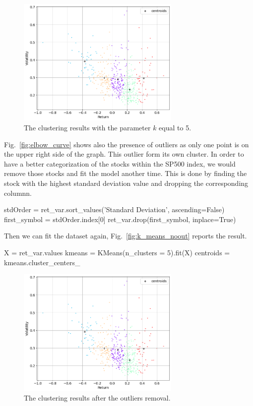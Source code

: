 \begin{figure}
\centering
\includegraphics[width=0.7\textwidth]{figures/k_means_5}
\caption{The clustering results with the parameter $k$ equal to 5.}
\label{fig:K_means_5}
\end{figure}
 
Fig.~\ref{fig:elbow_curve} shows also the presence of outliers as only one point is on the upper right side of the graph. This outlier form its own cluster. In order to have a better categorization of the stocks within the SP500 index, we would remove those stocks and fit the model another time.
This is done by finding the stock with the highest standard deviation value and dropping the corresponding columnn.
 
\begin{ipython}
stdOrder = ret_var.sort_values('Standard Deviation', ascending=False)
first_symbol = stdOrder.index[0]
ret_var.drop(first_symbol, inplace=True)
\end{ipython}
Then we can fit the dataset again, Fig.~\ref{fig:k_means_noout} reports the result.

\begin{ipython}
X = ret_var.values
kmeans = KMeans(n_clusters = 5).fit(X)
centroids = kmeans.cluster_centers_
\end{ipython}
 
\begin{figure}
\centering
\includegraphics[width=0.7\textwidth]{figures/k_means_noout}
\caption{The clustering results after the outliers removal.}
\label{fig:K_means_noout}
\end{figure}
  
